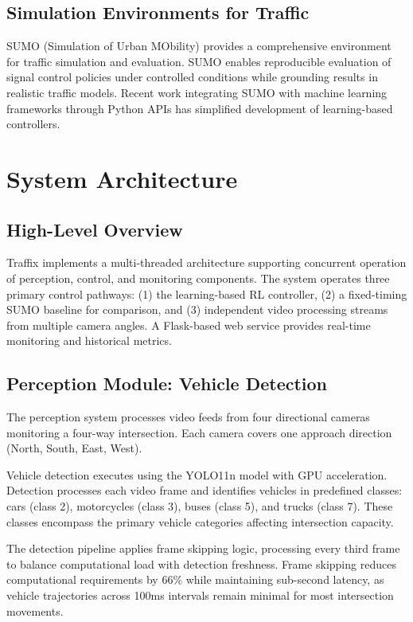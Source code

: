 \documentclass[10pt,conference]{IEEEtran}
\begin{document}
\subsection{Simulation Environments for Traffic}

SUMO (Simulation of Urban MObility) provides a comprehensive environment for traffic simulation and evaluation. SUMO enables reproducible evaluation of signal control policies under controlled conditions while grounding results in realistic traffic models. Recent work integrating SUMO with machine learning frameworks through Python APIs has simplified development of learning-based controllers.

\section{System Architecture}

\subsection{High-Level Overview}

Traffix implements a multi-threaded architecture supporting concurrent operation of perception, control, and monitoring components. The system operates three primary control pathways: (1) the learning-based RL controller, (2) a fixed-timing SUMO baseline for comparison, and (3) independent video processing streams from multiple camera angles. A Flask-based web service provides real-time monitoring and historical metrics.

\subsection{Perception Module: Vehicle Detection}

The perception system processes video feeds from four directional cameras monitoring a four-way intersection. Each camera covers one approach direction (North, South, East, West).

Vehicle detection executes using the YOLO11n model with GPU acceleration. Detection processes each video frame and identifies vehicles in predefined classes: cars (class 2), motorcycles (class 3), buses (class 5), and trucks (class 7). These classes encompass the primary vehicle categories affecting intersection capacity.

The detection pipeline applies frame skipping logic, processing every third frame to balance computational load with detection freshness. Frame skipping reduces computational requirements by 66\% while maintaining sub-second latency, as vehicle trajectories across 100ms intervals remain minimal for most intersection movements.
\end{document}
